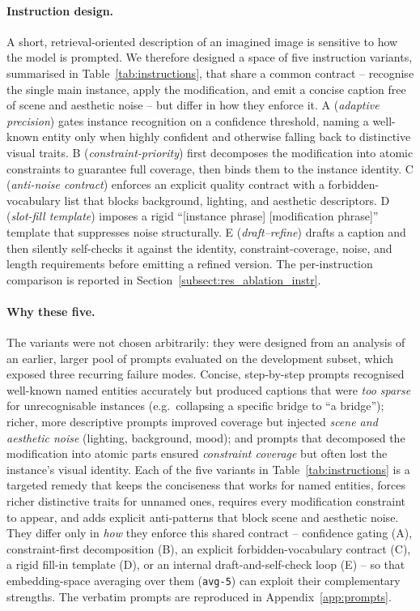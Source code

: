 \paragraph{Instruction design.} A short, retrieval-oriented description of an
imagined image is sensitive to how the model is prompted. We therefore designed
a space of five instruction variants, summarised in
Table~\ref{tab:instructions}, that share a common contract -- recognise the
single main instance, apply the modification, and emit a concise caption free of
scene and aesthetic noise -- but differ in how they enforce it.
\textsc{A} (\emph{adaptive precision}) gates instance recognition on a
confidence threshold, naming a well-known entity only when highly confident and
otherwise falling back to distinctive visual traits.
\textsc{B} (\emph{constraint-priority}) first decomposes the modification into
atomic constraints to guarantee full coverage, then binds them to the instance
identity.
\textsc{C} (\emph{anti-noise contract}) enforces an explicit quality contract
with a forbidden-vocabulary list that blocks background, lighting, and aesthetic
descriptors.
\textsc{D} (\emph{slot-fill template}) imposes a rigid
``[instance phrase] [modification phrase]'' template that suppresses noise
structurally.
\textsc{E} (\emph{draft--refine}) drafts a caption and then silently self-checks
it against the identity, constraint-coverage, noise, and length requirements
before emitting a refined version.
The per-instruction comparison is reported in
Section~\ref{subsect:res_ablation_instr}.

\paragraph{Why these five.} The variants were not chosen arbitrarily: they were
designed from an analysis of an earlier, larger pool of prompts evaluated on the
development subset, which exposed three recurring failure modes. Concise,
step-by-step prompts recognised well-known named entities accurately but produced
captions that were \emph{too sparse} for unrecognisable instances (e.g.\
collapsing a specific bridge to ``a bridge''); richer, more descriptive prompts
improved coverage but injected \emph{scene and aesthetic noise} (lighting,
background, mood); and prompts that decomposed the modification into atomic parts
ensured \emph{constraint coverage} but often lost the instance's visual identity.
Each of the five variants in Table~\ref{tab:instructions} is a targeted remedy
that keeps the conciseness that works for named entities, forces richer
distinctive traits for unnamed ones, requires every modification constraint to
appear, and adds explicit anti-patterns that block scene and aesthetic noise.
They differ only in \emph{how} they enforce this shared contract -- confidence
gating (A), constraint-first decomposition (B), an explicit forbidden-vocabulary
contract (C), a rigid fill-in template (D), or an internal draft-and-self-check
loop (E) -- so that embedding-space averaging over them (\texttt{avg-5}) can
exploit their complementary strengths. The verbatim prompts are reproduced in
Appendix~\ref{app:prompts}.

